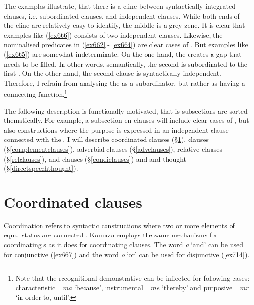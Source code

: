The examples illustrate, that there is a cline between syntactically integrated clauses, i.e. subordinated clauses, and independent clauses. While both ends of the cline are relatively easy to identify, the middle is a grey zone. It is clear that examples like (\ref{ex666}) consists of two independent clauses. Likewise, the nominalised predicates in (\ref{ex662} - \ref{ex664}) are clear cases of . But examples like (\ref{ex665}) are somewhat indeterminate. On the one hand, the   creates a gap that needs to be filled. In other words, semantically, the second  is subordinated to the first . On the other hand, the second clause is syntactically independent. Therefore, I refrain from analysing the  as a subordinator, but rather as having a connecting function.\footnote{Note that the recognitional demonstrative can be inflected for following cases: characteristic \emph{=ma} `because', instrumental \emph{=me} `thereby' and purposive \emph{=mr} `in order to, until'.}

The following description is functionally motivated, that is subsections are sorted thematically. For example, a subsection on  clauses will include clear cases of , but also constructions where the purpose is expressed in an independent clause connected with the . I will describe coordinated clauses ({\S}\ref{clausecoordination}),  clauses ({\S}\ref{complementclauses}), adverbial clauses ({\S}\ref{advclauses}), relative clauses ({\S}\ref{relclauses}),  and  clauses ({\S}\ref{condiclauses}) and  and thought ({\S}\ref{directspeechthought}).

\section{Coordinated clauses}\label{clausecoordination}

Coordination refers to syntactic constructions where two or more elements of equal status are connected \citep{Haspelmath:2007coordination}. Komnzo employs the same mechanisms for coordinating s as it does for coordinating clauses. The word \emph{a} `and' can be used for conjunctive  (\ref{ex667}) and the word \emph{o} `or' can be used for disjunctive  (\ref{ex714}).

